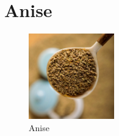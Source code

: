 


\section{Anise}
\label{sec:anise}




\begin{figure}
	\vspace{-\baselineskip}
	\includegraphics[width=0.33\textwidth]{imgs/spices/anise-s.jpg}
	\caption{Anise}
	\label{fig:anise}
\end{figure}


